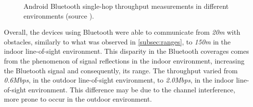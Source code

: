 \begin{figure}[ht]
	\centering
	\par\medskip
	\par\medskip        
	\caption{Android Bluetooth single-hop throughput measurements in different environments (source \cite{throughputpaper}).}
	\label{fig:btthroughput}
\end{figure}

Overall, the devices using Bluetooth were able to communicate from \textit{20m} with obstacles, similarly to what was observed in \ref{subsec:ranges}, to \textit{150m} in the indoor line-of-sight environment. This disparity in the Bluetooth coverages comes from the phenomenon of signal reflections in the indoor environment, increasing the Bluetooth signal and consequently, its range. The throughput varied from \textit{0.6Mbps}, in the outdoor line-of-sight environment, to \textit{2.0Mbps}, in the indoor line-of-sight environment. This difference may be due to the channel interference, more prone to occur in the outdoor environment. 

